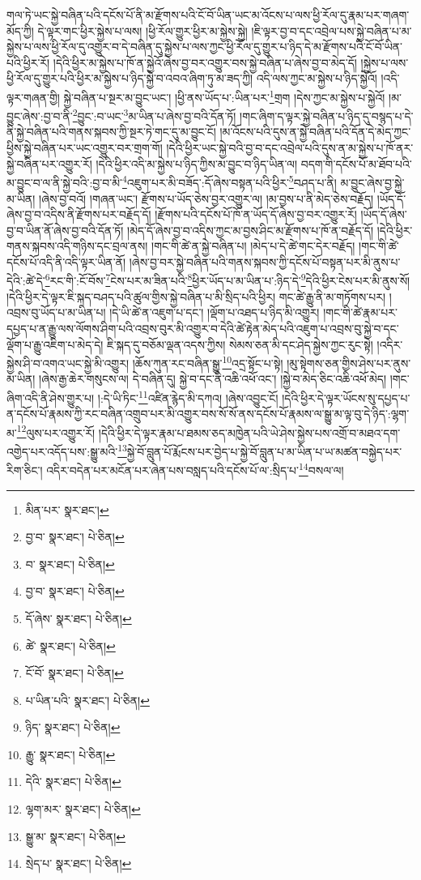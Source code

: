 གལ་ཏེ་ཡང་སྐྱེ་བཞིན་པའི་དངོས་པོ་ནི་མ་རྫོགས་པའི་ངོ་བོ་ཡིན་ཡང་མ་འོངས་པ་ལས་ཕྱི་རོལ་དུ་རྣམ་པར་གཞག་མོད་ཀྱི། དེ་ལྟར་གང་ཕྱིར་སྐྱེས་པ་ལས། །ཕྱི་རོལ་གྱུར་ཕྱིར་མ་སྐྱེས་སྐྱེ། །ཇི་ལྟར་བྱ་བ་དང་འབྲེལ་པས་སྐྱེ་བཞིན་པ་མ་སྐྱེས་པ་ལས་ཕྱི་རོལ་དུ་འགྱུར་བ་དེ་བཞིན་དུ་སྐྱེས་པ་ལས་ཀྱང་ཕྱི་རོལ་དུ་གྱུར་པ་ཉིད་དེ་མ་རྫོགས་པའི་ངོ་བོ་ཡིན་པའི་ཕྱིར་རོ། །དེའི་ཕྱིར་མ་སྐྱེས་པ་ཁོ་ན་སྐྱེའོ་ཞེས་བྱ་བར་འགྱུར་བས་སྐྱེ་བཞིན་པ་ཞེས་བྱ་བ་མེད་དོ། །སྐྱེས་པ་ལས་ཕྱི་རོལ་དུ་གྱུར་པའི་ཕྱིར་མ་སྐྱེས་པ་ཉིད་སྐྱེ་བ་འབའ་ཞིག་ཏུ་མ་ཟད་ཀྱི། འདི་ལས་ཀྱང་མ་སྐྱེས་པ་ཉིད་སྐྱེའོ། །འདི་ལྟར་གཞན་གྱི། སྐྱེ་བཞིན་པ་སྔར་མ་བྱུང་ཡང་། །ཕྱི་ནས་ཡོད་པ་:ཡིན་པར་\footnote{མིན་པར་  སྣར་ཐང་། }གྲག །དེས་ཀྱང་མ་སྐྱེས་པ་སྐྱེའོ། །མ་བྱུང་ཞེས་:བྱ་བ་ནི་\footnote{བྱ་བ་  སྣར་ཐང་།  པེ་ཅིན། }བྱུང་:བ་ཡང་\footnote{བ་  སྣར་ཐང་།  པེ་ཅིན། }མ་ཡིན་པ་ཞེས་བྱ་བའི་དོན་ཏོ། །གང་ཞིག་ད་ལྟར་སྐྱེ་བཞིན་པ་ཉིད་དུ་བསྙད་པ་དེ་ནི་སྐྱེ་བཞིན་པའི་གནས་སྐབས་ཀྱི་སྔར་ཏེ་གང་དུ་མ་བྱུང་ངོ། །མ་འོངས་པའི་དུས་ན་སྐྱེ་བཞིན་པའི་དོན་དེ་མེད་ཀྱང་ཕྱིས་སྐྱེ་བཞིན་པར་ཡང་འགྱུར་བར་གྲག་གོ། །དེའི་ཕྱིར་ཡང་སྐྱེ་བའི་བྱ་བ་དང་འབྲེལ་པའི་དུས་ན་མ་སྐྱེས་པ་ཁོ་ནར་སྐྱེ་བཞིན་པར་འགྱུར་རོ། །དེའི་ཕྱིར་འདི་མ་སྐྱེས་པ་ཉིད་ཀྱིས་མ་བྱུང་བ་ཉིད་ཡིན་ལ། བདག་གི་དངོས་པོ་མ་ཐོབ་པའི་མ་བྱུང་བ་ལ་ནི་སྐྱེ་བའི་:བྱ་བ་མི་\footnote{བྱ་བ་  སྣར་ཐང་།  པེ་ཅིན། }འཇུག་པར་མི་བཟོད་:དོ་ཞེས་བསྟན་པའི་ཕྱིར་\footnote{དོ་ཞེས་  སྣར་ཐང་།  པེ་ཅིན། }བཤད་པ་ནི། མ་བྱུང་ཞེས་བྱ་སྐྱེ་མ་ཡིན། །ཞེས་བྱ་བའོ། །གཞན་ཡང་། རྫོགས་པ་ཡོད་ཅེས་བྱར་འགྱུར་ལ། །མ་བྱས་པ་ནི་མེད་ཅེས་བརྗོད། །ཡོད་དོ་ཞེས་བྱ་བ་འདིས་ནི་རྫོགས་པར་བརྗོད་དོ། །རྫོགས་པའི་དངོས་པོ་ཁོ་ན་ཡོད་དོ་ཞེས་བྱ་བར་འགྱུར་རོ། །ཡོད་དོ་ཞེས་བྱ་བ་ཡིན་ནོ་ཞེས་བྱ་བའི་དོན་ཏོ། །མེད་དོ་ཞེས་བྱ་བ་འདིས་ཀྱང་མ་བྱས་ཤིང་མ་རྫོགས་པ་ཁོ་ན་བརྗོད་དོ། །དེའི་ཕྱིར་གནས་སྐབས་འདི་གཉིས་དང་བྲལ་ནས། །གང་གི་ཚེ་ན་སྐྱེ་བཞིན་པ། །མེད་པ་དེ་ཚེ་གང་དེར་བརྗོད། །གང་གི་ཚེ་དངོས་པོ་འདི་ནི་འདི་ལྟར་ཡིན་ནོ། །ཞེས་བྱ་བར་སྐྱེ་བཞིན་པའི་གནས་སྐབས་ཀྱི་དངོས་པོ་བསྟན་པར་མི་ནུས་པ་དེའི་:ཚེ་དེ་\footnote{ཚེ་  སྣར་ཐང་།  པེ་ཅིན། }རང་གི་:ངོ་བོས་\footnote{ངོ་བོ་  སྣར་ཐང་།  པེ་ཅིན། }ངེས་པར་མ་ཟིན་པའི་\footnote{པ་ཡིན་པའི་  སྣར་ཐང་།  པེ་ཅིན། }ཕྱིར་ཡོད་པ་མ་ཡིན་པ་:ཉིད་དེ་\footnote{ཉིད་  སྣར་ཐང་།  པེ་ཅིན། }དེའི་ཕྱིར་ངེས་པར་མི་ནུས་སོ། །དེའི་ཕྱིར་དེ་ལྟར་ཇི་སྐད་བཤད་པའི་ཚུལ་གྱིས་སྐྱེ་བཞིན་པ་མི་སྲིད་པའི་ཕྱིར། གང་ཚེ་རྒྱུ་ནི་མ་གཏོགས་པར། །འབྲས་བུ་ཡོད་པ་མ་ཡིན་པ། །དེ་ཡི་ཚེ་ན་འཇུག་པ་དང་། །ལྡོག་པ་འཐད་པ་ཉིད་མི་འགྱུར། །གང་གི་ཚེ་རྣམ་པར་དཔྱད་པ་ན་རྒྱུ་ལས་ལོགས་ཤིག་པའི་འབྲས་བུར་མི་འགྱུར་བ་དེའི་ཚེ་རྟེན་མེད་པའི་འཇུག་པ་འབྲས་བུ་སྐྱེ་བ་དང་ལྡོག་པ་རྒྱུ་འཇིག་པ་མེད་དེ། ཇི་སྐད་དུ་བཅོམ་ལྡན་འདས་ཀྱིས། སེམས་ཅན་མི་དང་ཤེད་སྐྱེས་ཀྱང་རུང་སྟེ། །འདིར་སྐྱེས་ཤི་བ་འགའ་ཡང་སྐྱེ་མི་འགྱུར། །ཆོས་ཀུན་རང་བཞིན་སྒྱུ་\footnote{རྒྱུ་  སྣར་ཐང་།  པེ་ཅིན། }འདྲ་སྟོང་པ་སྟེ། །མུ་སྟེགས་ཅན་གྱིས་ཤེས་པར་ནུས་མ་ཡིན། །ཞེས་རྒྱ་ཆེར་གསུངས་ལ། དེ་བཞིན་དུ། སྐྱེ་བ་དང་ནི་འཆི་འཕོ་འང་། །སྐྱེ་བ་མེད་ཅིང་འཆི་འཕོ་མེད། །གང་ཞིག་འདི་ནི་ཤེས་གྱུར་པ། །:དེ་ཡི་ཏིང་\footnote{དེའི་  སྣར་ཐང་།  པེ་ཅིན། }འཛིན་རྙེད་མི་དཀའ། །ཞེས་འབྱུང་ངོ། །དེའི་ཕྱིར་དེ་ལྟར་ཡོངས་སུ་དཔྱད་པ་ན་དངོས་པོ་རྣམས་ཀྱི་རང་བཞིན་འགྲུབ་པར་མི་འགྱུར་བས་སོ་སོ་ནས་དངོས་པོ་རྣམས་ལ་སྒྱུ་མ་ལྟ་བུ་དེ་ཉིད་:ལྷག་མ་\footnote{ལྷག་མར་  སྣར་ཐང་།  པེ་ཅིན། }ལུས་པར་འགྱུར་རོ། །དེའི་ཕྱིར་དེ་ལྟར་རྣམ་པ་ཐམས་ཅད་མཁྱེན་པའི་ཡེ་ཤེས་སྐྱེས་པས་འགྲོ་བ་མཐའ་དག་འགྱེད་པར་འདོད་པས་:སྒྱུ་མའི་\footnote{སྒྱུ་མ་  སྣར་ཐང་།  པེ་ཅིན། }སྐྱེ་བོ་བླུན་པོ་རྨོངས་པར་བྱེད་པ་སྐྱེ་བོ་བླུན་པ་མ་ཡིན་པ་ཡ་མཚན་བསྐྱེད་པར་རིག་ཅིང་། འདིར་བདེན་པར་མངོན་པར་ཞེན་པས་བསླད་པའི་དངོས་པོ་ལ་:སྲིད་པ་\footnote{སྲེད་པ་  སྣར་ཐང་།  པེ་ཅིན། }བསལ་ལ། 